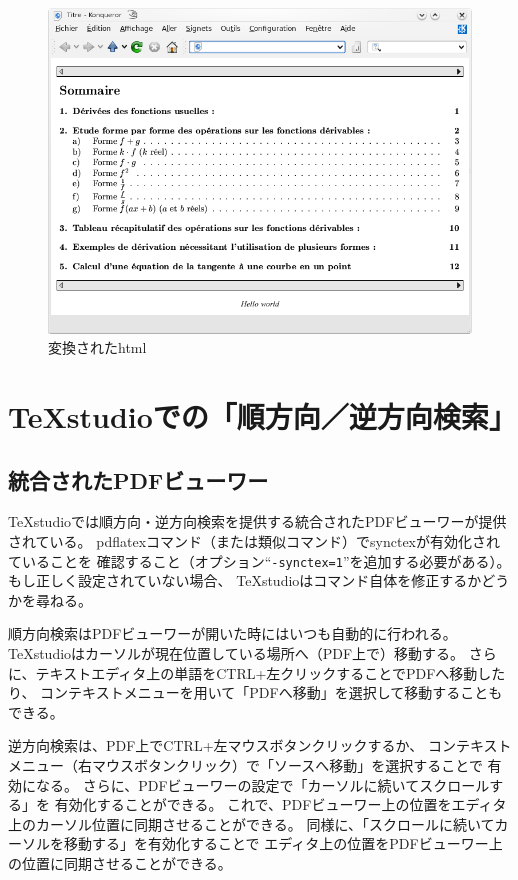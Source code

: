 \begin{figure}[H]
  \centering
  \includegraphics[width=.8\linewidth]{doc19.png}
  \caption{変換されたhtml}
\end{figure}

\section{TeXstudioでの「順方向／逆方向検索」}\label{sec:search}

\subsection{統合されたPDFビューワー}

TeXstudioでは順方向・逆方向検索を提供する統合されたPDFビューワーが提供されている。
pdflatexコマンド（または類似コマンド）でsynctexが有効化されていることを
確認すること（オプション``\texttt{-synctex=1}''を追加する必要がある）。
もし正しく設定されていない場合、
TeXstudioはコマンド自体を修正するかどうかを尋ねる。

順方向検索はPDFビューワーが開いた時にはいつも自動的に行われる。
TeXstudioはカーソルが現在位置している場所へ（PDF上で）移動する。
さらに、テキストエディタ上の単語をCTRL+左クリックすることでPDFへ移動したり、
コンテキストメニューを用いて「PDFへ移動」を選択して移動することもできる。

逆方向検索は、PDF上でCTRL+左マウスボタンクリックするか、
コンテキストメニュー（右マウスボタンクリック）で「ソースへ移動」を選択することで
有効になる。
さらに、PDFビューワーの設定で「カーソルに続いてスクロールする」を
有効化することができる。
これで、PDFビューワー上の位置をエディタ上のカーソル位置に同期させることができる。
同様に、「スクロールに続いてカーソルを移動する」を有効化することで
エディタ上の位置をPDFビューワー上の位置に同期させることができる。

